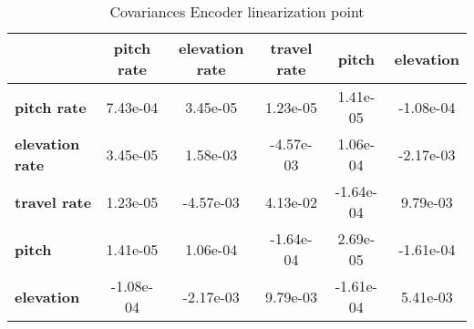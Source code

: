 \begin{table}[h!]
\centering
\begin{tiny}\begin{tabular}{|l|c|c|c|c|c|}
\hline
&\textbf{pitch rate}&\textbf{elevation rate}&\textbf{travel rate}&\textbf{pitch}&\textbf{elevation}\\\hline
\textbf{pitch rate}&7.43e-04&3.45e-05&1.23e-05&1.41e-05&-1.08e-04\\\hline
\textbf{elevation rate}&3.45e-05&1.58e-03&-4.57e-03&1.06e-04&-2.17e-03\\\hline
\textbf{travel rate}&1.23e-05&-4.57e-03&4.13e-02&-1.64e-04&9.79e-03\\\hline
\textbf{pitch}&1.41e-05&1.06e-04&-1.64e-04&2.69e-05&-1.61e-04\\\hline
\textbf{elevation}&-1.08e-04&-2.17e-03&9.79e-03&-1.61e-04&5.41e-03\\\hline
\end{tabular}
\end{tiny}
\caption{Covariances Encoder linearization point}
\label{table:V_E_lin}
\end{table}